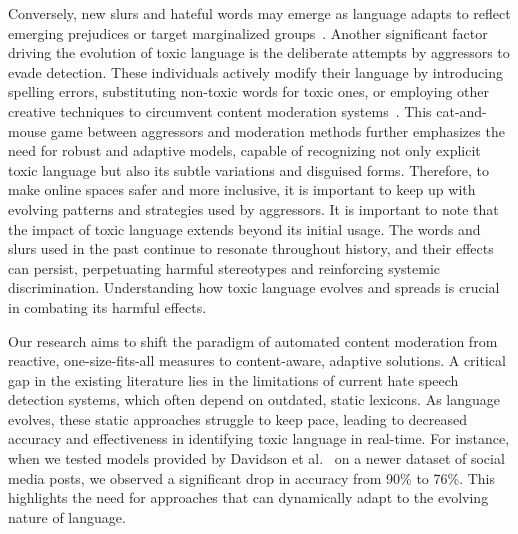 Conversely, new slurs and hateful words may emerge as language adapts to reflect emerging prejudices or target marginalized groups~\cite{schild2020go,young2021young,gao-etal-2017-recognizing}.
Another significant factor driving the evolution of toxic language is the deliberate attempts by aggressors to evade detection.
These individuals actively modify their language by introducing spelling errors, substituting non-toxic words for toxic ones, or employing other creative techniques to circumvent content moderation systems~\cite{fortuna2018survey}.
This cat-and-mouse game between aggressors and moderation methods further emphasizes the need for robust and adaptive models, capable of recognizing not only explicit toxic language but also its subtle variations and disguised forms. Therefore, to make online spaces safer and more inclusive, it is important to keep up with evolving patterns and strategies used by aggressors.
It is important to note that the impact of toxic language extends beyond its initial usage. The words and slurs used in the past continue to resonate throughout history, and their effects can persist, perpetuating harmful stereotypes and reinforcing systemic discrimination.
Understanding how toxic language evolves and spreads is crucial in combating its harmful effects.

Our research aims to shift the paradigm of automated content moderation from reactive, one-size-fits-all measures to content-aware, adaptive solutions. A critical gap in the existing literature lies in the limitations of current hate speech detection systems, which often depend on outdated, static lexicons. As language evolves, these static approaches struggle to keep pace, leading to decreased accuracy and effectiveness in identifying toxic language in real-time. For instance, when we tested models provided by Davidson et al.~\cite{davidson2017automated} on a newer dataset of social media posts, we observed a significant drop in accuracy from 90\% to 76\%. This highlights the need for approaches that can dynamically adapt to the evolving nature of language.

